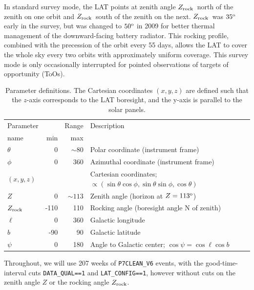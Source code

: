 \documentclass[aps,twocolumn,prd,superscriptaddress,showpacs,nofootinbib,fixfloat]{revtex4}
\newcommand{\degree}{^{\rm o}}
\newcommand{\zrock}{$Z_{\rm rock}$}
\begin{document}
In standard survey mode, the LAT points at zenith angle \zrock\ north of the
zenith on one orbit and \zrock\ south of the zenith on the next.  \zrock\ was
$35\degree$ early in the survey, but was changed to $50\degree$ in 2009 for
better thermal management of the downward-facing battery radiator.  This
rocking profile, combined with the precession of the orbit every 55 days,
allows the LAT to cover the whole sky every two orbits with approximately
uniform coverage.  This survey mode is only occasionally interrupted for
pointed observations of targets of opportunity (ToOs).

\begin{table}
\begin{center}
  \begin{tabular}{l|rr|l}
    \hline
    Parameter & & Range &  Description\\
    name      & min & max &            \\
    \hline
    $\theta$ &    0 &  $\sim80$ & Polar coordinate (instrument frame) \\
    $\phi$   &    0 &       360 & Azimuthal coordinate (instrument frame) \\
    $(x,y,z)$&      &     & Cartesian coordinates;
    $\propto(\sin\theta\cos\phi, \sin\theta\sin\phi, \cos\theta)$\\
    $Z$      &    0 & $\sim113$ & Zenith angle (horizon at $Z=113\degree$) \\
    \zrock\  & -110 & 110 & Rocking angle (boresight angle N of zenith) \\
    $\ell$   &    0 & 360 & Galactic longitude \\
    $b$      &  -90 &  90 & Galactic latitude \\
    $\psi$   &    0 & 180 & Angle to Galactic center; $\cos\psi=\cos\ell\cos b$ \\
    \hline
  \end{tabular}
  \caption{Parameter definitions. The Cartesian coordinates $(x, y, z)$ are
  defined such that the $z$-axis corresponds to the LAT boresight, and the
  y-axis is parallel to the solar panels.}
  \label{tab:eventRatios}
\end{center}
\end{table}

Throughout, we will use 207 weeks of \texttt{P7CLEAN\_V6} events, with the
good-time-interval cuts \texttt{DATA\_QUAL==1} and \texttt{LAT\_CONFIG==1},
however without cuts on the zenith angle $Z$ or the rocking angle \zrock. 
\end{document}

